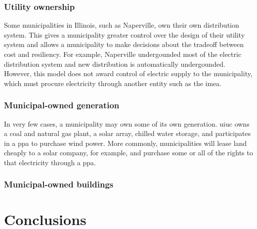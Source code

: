 \subsection{Utility ownership}
Some municipalities in Illinois, such as Naperville, own their own distribution
system. This gives a municipality greater control over the design of their
utility system and allows a municipality to make decisions about the tradeoff
between cost and resiliency. For example, Naperville undergounded most of the
electric distribution system and new distribution is automatically undergounded.
However, this model does not award control of electric supply to the
municipality, which must procure electricity through another entity such as the
\acf{imea}.

\subsection{Municipal-owned generation}
In very few cases, a municipality may own some of its own generation. \ac{uiuc}
owns a coal and natural gas plant, a solar array, chilled water storage, and
participates in a \ac{ppa} to purchase wind power. More commonly, municipalities
will lease land cheaply to a solar company, for example, and purchase some or
all of the rights to that electricity through a \ac{ppa}. 

\subsection{Municipal-owned buildings}

\fi

\chapter{Conclusions}
